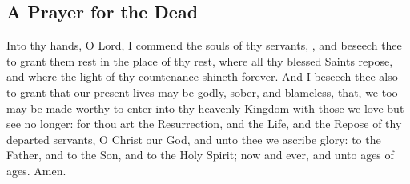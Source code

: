 \subsection{A Prayer for the Dead}

Into thy hands, O Lord, I commend the souls of thy servants, , and beseech thee to grant them rest in the place of thy rest, where all thy blessed Saints repose, and where the light of thy countenance shineth forever. And I beseech thee also to grant that our present lives may be godly, sober, and blameless, that, we too may be made worthy to enter into thy heavenly Kingdom with those we love but see no longer: for thou art the Resurrection, and the Life, and the Repose of thy departed servants, O Christ our God, and unto thee we ascribe glory: to the Father, and to the Son, and to the Holy Spirit; now and ever, and unto ages of ages. Amen.
